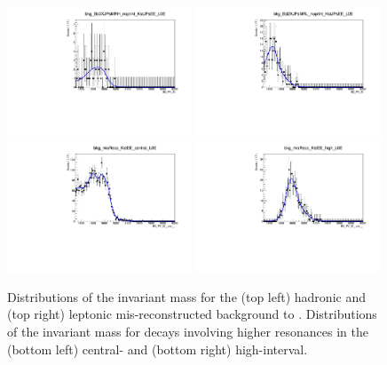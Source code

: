 \begin{figure}[t!]
\centering
\includegraphics[width=0.49\textwidth]{RKst/figs/Fit/fit_EE/rooKeysModel_bkg_Bd2XJPsMRH_noprint_KstJPsEE_L0E.pdf}
\includegraphics[width=0.49\textwidth]{RKst/figs/Fit/fit_EE/rooKeysModel_bkg_Bd2XJPsMRL_noprint_KstJPsEE_L0E.pdf}
\includegraphics[width=0.49\textwidth]{RKst/figs/Fit/fit_EE/rooKeysModel_bkg_misReco_KstEE_central_L0E.pdf}
\includegraphics[width=0.49\textwidth]{RKst/figs/Fit/fit_EE/rooKeysModel_bkg_misReco_KstEE_high_L0E.pdf}
\caption{Distributions of the \mKpiee invariant mass for the (top left) hadronic and (top right) leptonic mis-reconstructed background to \BdToKstJPsee. Distributions of the \mKpiee invariant mass for decays involving
higher \Kstarz resonances in the (bottom left) central- and (bottom right) high-\qsq interval.}
\label{fig:misreco}


\end{figure}
